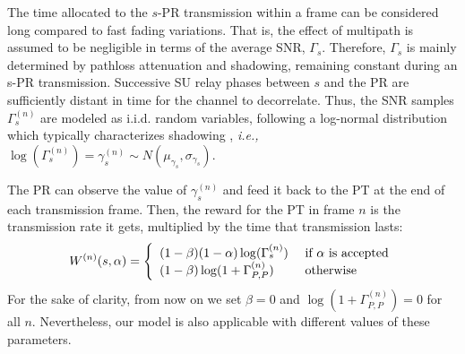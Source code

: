 The time allocated to the $s$-PR transmission within a frame can be considered long compared to fast fading variations. That is, the effect of multipath is assumed to be negligible in terms of the average SNR, $\Gamma_s$. Therefore, $\Gamma_s$ is mainly determined by pathloss attenuation and shadowing, remaining constant during an s-PR transmission. Successive SU relay phases between $s$ and the PR are sufficiently distant in time for the channel to decorrelate. Thus, the SNR samples $\Gamma_s^{(n)}$ are modeled as i.i.d. random variables, following a log-normal distribution which typically characterizes shadowing \cite{ref:Goldsmith2009}, \textit{i.e.,} $\log(\Gamma_s^{(n)})=\gamma_s^{(n)} \sim N(\mu_{\gamma_s},\sigma_{\gamma_s})$. 

The PR can observe the value of $\gamma_s^{(n)}$ and feed it back to the PT at the end of each transmission frame. Then, the reward for the PT in frame $n$ is the transmission rate it gets, multiplied by the time that transmission lasts:
\begin{equation}\label{eq:W}
W^{(n)}(s,\alpha) = \left\{ 
  \begin{array}{l l}
    (1-\beta)(1-\alpha)\log({\Gamma_s^{(n)}}) & \text{  } \text{if } \alpha \text{ is accepted}\\
    (1-\beta)\log(1+\Gamma_{P,P}^{(n)}) & \text{  } \text{otherwise}
  \end{array} \right.
\end{equation}
For the sake of clarity, from now on we set $\beta=0$ and $\log{(1+\Gamma_{P,P}^{(n)})} = 0$ for all $n$. Nevertheless, our model is also applicable with different values of these parameters. 



